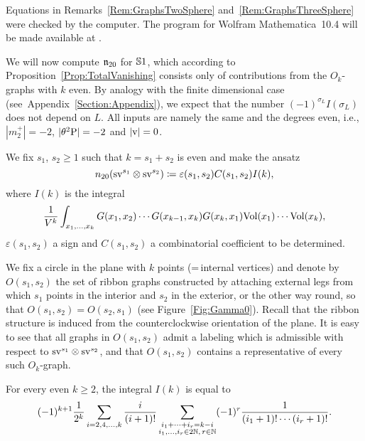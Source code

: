 \documentclass[\MainFolder/Text.tex]{subfiles}
\begin{document}
Equations in Remarks~\ref{Rem:GraphsTwoSphere} and~\ref{Rem:GraphsThreeSphere} were checked by the computer. The program for Wolfram Mathematica~10.4 will be made available at \cite{sourcecode}. 


We will now compute $\mathfrak{n}_{20}$ for $\mathbb{S}{1}$, which according to Proposition~\ref{Prop:TotalVanishing} consists only of contributions from the $O_k$-graphs with $k$ even. 
By analogy with the finite dimensional case (see~Appendix~\ref{Section:Appendix}), we expect that the number $(-1)^{\sigma_L}I(\sigma_L)$ does not depend on $L$. All inputs are namely the same and the degrees even, i.e., $|m_2^+| = -2$, $|\theta^2\mathrm{P}| = -2$ and $|\mathrm{v}| = 0$. 

We fix $s_1$, $s_2\ge 1$ such that $k=s_1+s_2$ is even and make the ansatz
\begin{equation*}
n_{20}(\mathrm{s} \mathrm{v}^{s_1}\otimes  \mathrm{s} \mathrm{v}^{s_2}) \coloneqq \varepsilon(s_1,s_2) C(s_1,s_2) I(k),
\end{equation*}
where $I(k)$ is the integral
\begin{equation} \label{Eq:Ik}
\frac{1}{V^k}\int_{x_1, \dotsc, x_{k}} G(x_1,x_2) \dotsm G(x_{k-1},x_{k})G(x_{k},x_1)\mathrm{Vol}(x_1) \dotsm \mathrm{Vol}(x_{k}), \end{equation}
$\varepsilon(s_1,s_2)$ a sign and $C(s_1,s_2)$ a combinatorial coefficient to be determined.

We fix a circle in the plane with $k$ points (=\,internal vertices) and denote by $O(s_1,s_2)$ the set of ribbon graphs constructed by attaching external legs from which $s_1$ points in the interior and $s_2$ in the exterior, or the other way round, so that $O(s_1,s_2) = O(s_2, s_1)$ (see Figure~\ref{Fig:Gamma0}). Recall that the ribbon structure is induced from the counterclockwise orientation of the plane. It is easy to see that all graphs in $O(s_1,s_2)$ admit a labeling which is admissible with respect to $\mathrm{s} \mathrm{v}^{s_1} \otimes \mathrm{s} \mathrm{v}^{s_2}$, and that $O(s_1,s_2)$ contains a representative of every such $O_k$-graph. 

\begin{Lemma} \label{Lemma:IntegralFor1}
For every even $k\ge 2$, the integral $I(k)$ is equal to
 \begin{equation}\label{Eq:TheFormulaForIk}
 (-1)^{k+1} \frac{1}{2^k}\sum_{i=2, 4, \dotsc ,k} \frac{i}{(i+1)!} \sum_{\substack{i_1+ \dotsb +i_r = k-i \\ i_1, \dotsc, i_r \in 2\mathbb{N},\, r\in \mathbb{N}}} (-1)^r \frac{1}{(i_1+1)! \dotsm (i_r+1)!}.
 \end{equation}
\end{Lemma}
\end{document}

